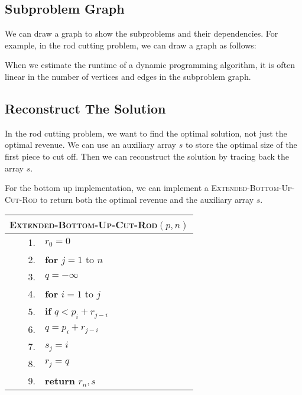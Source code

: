 \documentclass[a4paper,12pt]{article}
\begin{document}
\subsection{Subproblem Graph}

We can draw a graph to show the subproblems and their dependencies.
For example, in the rod cutting problem, we can draw a graph as follows:
\begin{center}
\end{center}

When we estimate the runtime of a dynamic programming algorithm, it is often linear in the number of vertices and edges in the subproblem graph.

\subsection{Reconstruct The Solution}

In the rod cutting problem, we want to find the optimal solution, not just the optimal revenue.
We can use an auxiliary array $s$ to store the optimal size of the first piece to cut off.
Then we can reconstruct the solution by tracing back the array $s$.

For the bottom up implementation, we can implement a \textsc{Extended-Bottom-Up-Cut-Rod} to return both the optimal revenue and the auxiliary array $s$.
\begin{center}
	\begin{tabular}{rl}
		\toprule
		\multicolumn{2}{l}{\textsc{Extended-Bottom-Up-Cut-Rod}$(p, n)$} \\
		\midrule
		1. & $r_0 = 0$ \\
		2. & \textbf{for} $j = 1$ to $n$ \\
		3. & \quad $q = -\infty$ \\
		4. & \quad \textbf{for} $i = 1$ to $j$ \\
		5. & \quad \quad \textbf{if} $q < p_i + r_{j - i}$ \\
		6. & \quad \quad \quad $q = p_i + r_{j - i}$ \\
		7. & \quad \quad \quad $s_j = i$ \\
		8. & \quad $r_j = q$ \\
		9. & \textbf{return} $r_n, s$ \\
		\bottomrule
	\end{tabular}
\end{center}
\end{document}
